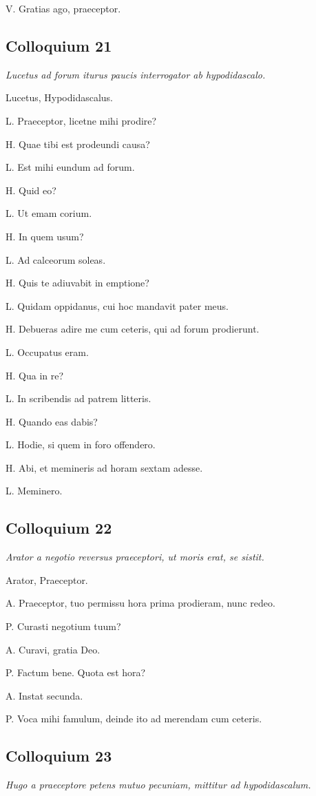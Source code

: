 \documentclass{article}
\begin{document}
V. Gratias ago, praeceptor.

\subsection{Colloquium 21}
\emph{Lucetus ad forum iturus paucis interrogator ab hypodidascalo.}

Lucetus, Hypodidascalus.

L. Praeceptor, licetne mihi prodire?

H. Quae tibi est prodeundi causa?

L. Est mihi eundum ad forum.

H. Quid eo?

L. Ut emam corium.

H. In quem usum?

L. Ad calceorum soleas.

H. Quis te adiuvabit in emptione?

L. Quidam oppidanus, cui hoc mandavit pater meus.

H. Debueras adire me cum ceteris, qui ad forum prodierunt.

L. Occupatus eram.

H. Qua in re?

L. In scribendis ad patrem litteris.

H. Quando eas dabis?

L. Hodie, si quem in foro offendero.

H. Abi, et memineris ad horam sextam adesse.

L. Meminero.

\subsection{Colloquium 22}
\emph{Arator a negotio reversus praeceptori, ut moris erat, se sistit.}

Arator, Praeceptor.

A. Praeceptor, tuo permissu hora prima prodieram, nunc redeo.

P. Curasti negotium tuum?

A. Curavi, gratia Deo.

P. Factum bene. Quota est hora?

A. Instat secunda.

P. Voca mihi famulum, deinde ito ad merendam cum ceteris.

\subsection{Colloquium 23}
\emph{Hugo a praeceptore petens mutuo pecuniam, mittitur ad hypodidascalum.}
\end{document}
